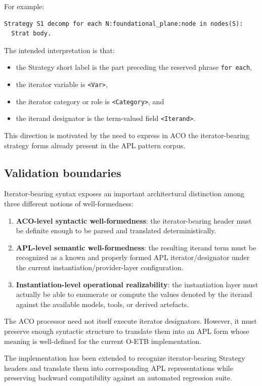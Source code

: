 \documentclass[11pt,twoside,a4paper]{article}
\begin{document}
For example:
\begin{verbatim}
Strategy S1 decomp for each N:foundational_plane:node in nodes(S):
  Strat body.
\end{verbatim}

The intended interpretation is that:
\begin{itemize}[leftmargin=2em]
  \item the Strategy short label is the part preceding the reserved phrase \texttt{for each},
  \item the iterator variable is \texttt{<Var>},
  \item the iterator category or role is \texttt{<Category>}, and
  \item the iterand designator is the term-valued field \texttt{<Iterand>}.
\end{itemize}

This direction is motivated by the need to express in ACO the iterator-bearing strategy forms already present in the APL pattern corpus.

\subsection{Validation boundaries}

Iterator-bearing syntax exposes an important architectural distinction among three different notions of well-formedness:
\begin{enumerate}[leftmargin=2em]
  \item \textbf{ACO-level syntactic well-formedness}: the iterator-bearing header must be definite enough to be parsed and translated deterministically.
  \item \textbf{APL-level semantic well-formedness}: the resulting iterand term must be recognized as a known and properly formed APL iterator/designator under the current instantiation/provider-layer configuration.
  \item \textbf{Instantiation-level operational realizability}: the instantiation layer must actually be able to enumerate or compute the values denoted by the iterand against the available models, tools, or derived artefacts.
\end{enumerate}

The ACO processor need not itself execute iterator designators.
However, it must preserve enough syntactic structure to translate them into an APL form whose meaning is well-defined for the current O-ETB implementation.

The implementation has been extended to recognize iterator-bearing Strategy headers and translate them into corresponding APL representations while preserving backward compatibility against an automated regression suite.
\end{document}
